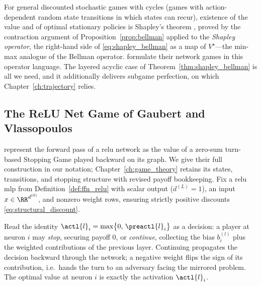\begin{remark}\label{rem:shapley_history}
For general discounted stochastic games with cycles (games with action-dependent random state transitions in which states can recur), existence of the value and of optimal stationary policies is Shapley's theorem \parencite{Shapley1953stochastic}, proved by the contraction argument of Proposition~\ref{prop:bellman} applied to the \emph{Shapley operator}, the right-hand side of \eqref{eq:shapley_bellman} as a map of $V^{\star}$---the min-max analogue of the Bellman operator. \textcite{Gaubert2025} formulate their network games in this operator language. The layered acyclic case of Theorem~\ref{thm:shapley_bellman} is all we need, and it additionally delivers subgame perfection, on which Chapter~\ref{ch:trajectory} relies.
\end{remark}

\subsection{The ReLU Net Game of Gaubert and Vlassopoulos}\label{subsec:relu_net_game}

\textcite{Gaubert2025} represent the forward pass of a \ac{relu} network as the value of a zero-sum turn-based Stopping Game played backward on its graph. We give their full construction in our notation; Chapter~\ref{ch:game_theory} retains its states, transitions, and stopping structure with revised payoff bookkeeping. Fix a \ac{relu} \ac{mlp} from Definition~\ref{def:ffn_relu} with scalar output ($d^{(L)}=1$), an input $x\in\RR^{d^{(0)}}$, and nonzero weight rows, ensuring strictly positive discounts \eqref{eq:structural_discount}.

Read the identity $\actl{l}_i = \max\bigl\{0,\, \preactl{l}_i\bigr\}$ as a decision: a player at neuron $i$ may \emph{stop}, securing payoff $0$, or \emph{continue}, collecting the bias $b^{(l)}_i$ plus the weighted contributions of the previous layer. Continuing propagates the decision backward through the network; a negative weight flips the sign of its contribution, i.e.\ hands the turn to an adversary facing the mirrored problem. The optimal value at neuron $i$ is exactly the activation $\actl{l}_i$.

